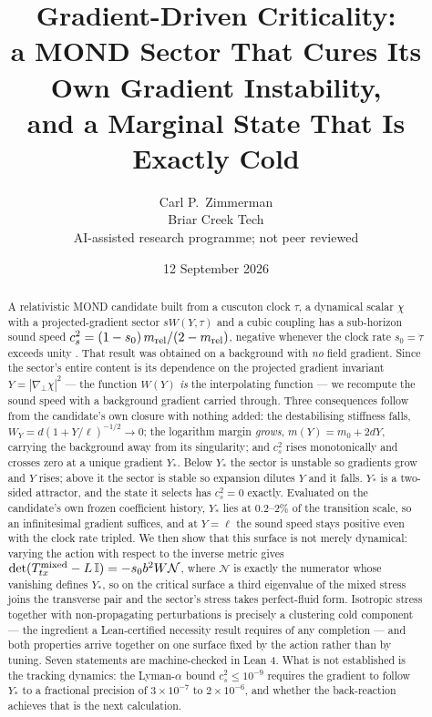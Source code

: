 \documentclass[11pt,letterpaper]{article}
\title{Gradient-Driven Criticality:\\ a MOND Sector That Cures Its Own Gradient Instability,\\ and a Marginal State That Is Exactly Cold}
\author{Carl P.\ Zimmerman\\ \small Briar Creek Tech\\ \small AI-assisted research programme; not peer reviewed}
\date{12 September 2026}
\begin{document}
\maketitle
\begin{abstract}
A relativistic MOND candidate built from a cuscuton clock $\tau$, a dynamical scalar $\chi$ with a projected-gradient sector $sW(Y,\tau)$ and a cubic coupling has a sub-horizon sound speed $c_s^2=(1-s_0)\,m_{\rm rel}/(2-m_{\rm rel})$, negative whenever the clock rate $s_0=\dot\tau$ exceeds unity \cite{paper17}. That result was obtained on a background with \emph{no} field gradient. Since the sector's entire content is its dependence on the projected gradient invariant $Y=|\nabla_\perp\chi|^2$ --- the function $W(Y)$ \emph{is} the interpolating function --- we recompute the sound speed with a background gradient carried through. Three consequences follow from the candidate's own closure with nothing added: the destabilising stiffness falls, $W_Y=d(1+Y/\ell)^{-1/2}\to0$; the logarithm margin \emph{grows}, $m(Y)=m_0+2dY$, carrying the background away from its singularity; and $c_s^2$ rises monotonically and crosses zero at a unique gradient $Y_*$. Below $Y_*$ the sector is unstable so gradients grow and $Y$ rises; above it the sector is stable so expansion dilutes $Y$ and it falls. $Y_*$ is a two-sided attractor, and the state it selects has $c_s^2=0$ exactly. Evaluated on the candidate's own frozen coefficient history, $Y_*$ lies at $0.2$--$2\%$ of the transition scale, so an infinitesimal gradient suffices, and at $Y=\ell$ the sound speed stays positive even with the clock rate tripled. We then show that this surface is not merely dynamical: varying the action with respect to the inverse metric gives $\det(T^{\rm mixed}_{tx}-L\,\mathbb{I})=-s_0b^2W\mathcal{N}$, where $\mathcal{N}$ is exactly the numerator whose vanishing defines $Y_*$, so on the critical surface a third eigenvalue of the mixed stress joins the transverse pair and the sector's stress takes perfect-fluid form. Isotropic stress together with non-propagating perturbations is precisely a clustering cold component --- the ingredient a Lean-certified necessity result requires of any completion --- and both properties arrive together on one surface fixed by the action rather than by tuning. Seven statements are machine-checked in Lean 4. What is not established is the tracking dynamics: the Lyman-$\alpha$ bound $c_s^2\le10^{-9}$ requires the gradient to follow $Y_*$ to a fractional precision of $3\times10^{-7}$ to $2\times10^{-6}$, and whether the back-reaction achieves that is the next calculation.
\end{abstract}
\end{document}
